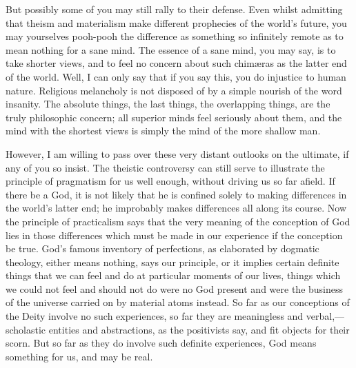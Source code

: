 \documentclass[12pt]{article}
\begin{document}
But possibly some of you may still rally to their defense. Even whilst admitting that theism and materialism make different prophecies of the world's future, you may yourselves pooh-pooh the difference as something so infinitely remote as to mean nothing for a sane mind. The essence of a sane mind, you may say, is to take shorter views, and to feel no concern about such chim{\ae}ras as the latter end of the world. Well, I can only say that if you say this, you do injustice to human nature. Religious melancholy is not disposed of by a simple nourish of the word insanity. The absolute things, the last things, the overlapping things, are the truly philosophic concern; all superior minds feel seriously about them, and the mind with the shortest views is simply the mind of the more shallow man. 

However, I am willing to pass over these very distant outlooks on the ultimate, if any of you so insist. The theistic controversy can still serve to illustrate the principle of pragmatism for us well enough, without driving us so far afield. If there be a God, it is not likely that he is confined solely to making differences in the world's latter end; he improbably makes differences all along its course. Now the principle of practicalism says that the very meaning of the conception of God lies in those differences which must be made in our experience if the conception be true. God's famous inventory of perfections, as elaborated by dogmatic theology, either means nothing, says our principle, or it implies certain definite things that we can feel and do at particular moments of our lives, things which we could not feel and should not do were no God present and were the business of the universe carried on by material atoms instead. So far as our conceptions of the Deity involve no such experiences, so far they are meaningless and verbal,--- scholastic entities and abstractions, as the positivists say, and fit objects for their scorn. But so far as they do involve such definite experiences, God means something for us, and may be real. 
\end{document}

